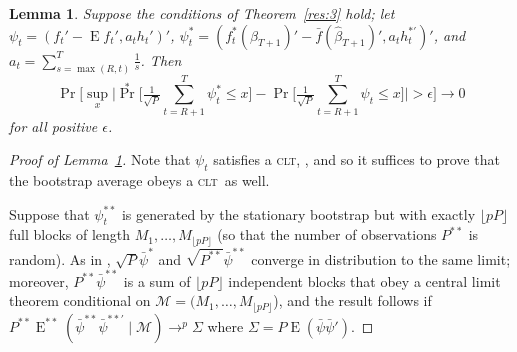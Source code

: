 \documentclass[11pt,fleqn]{article}
\newtheorem{lema}{Lemma}[section]
\theoremstyle{definition}
\DeclareMathOperator{\E}{E}
\DeclareMathOperator{\pr}{Pr}
\newcommand{\clt}{\textsc{clt}}
\begin{document}
\begin{lema}\label{res:a3}
  Suppose the conditions of Theorem~\ref{res:3} hold; let $\psi_{t} =
  (f_{t}' - \E f_{t}', a_t h_{t}')'$, $\psi_t^{*} =
  (f_t^{*}(\hat{\beta}_{T+1})' - \bar{f}(\hat{\beta}_{T+1})', a_t
  h_t^{*\prime})'$, and $a_t = \sum_{s=\max(R,t)}^T \tfrac{1}{s}$.  Then
  \begin{equation}\label{eq:1}
    \pr\Big[\sup_x \Big| \pr^{*}\Big[ \tfrac{1}{\sqrt{P}} \sum_{t=R+1}^T \psi_{t}^{*}
    \leq x \Big] - \pr\Big[ \tfrac{1}{\sqrt{P}} \sum_{t=R+1}^T \psi_{t}
    \leq x \Big] \Big| > \epsilon \Big] \to 0
  \end{equation}
  for all positive $\epsilon$.
\end{lema}

\begin{proof}[Proof of Lemma~\ref{res:a3}]
  Note that $\psi_t$ satisfies a \clt, \citep[Theorem~2]{Jon:97}, and
  so it suffices to prove that the bootstrap average obeys a \clt\ as
  well.

  Suppose that $\psi_t^{**}$ is generated by the stationary bootstrap but
  with exactly $\lfloor p P \rfloor$ full blocks of length
  $M_1,\dots,M_{\lfloor p P \rfloor}$ (so that the number of
  observations $P^{**}$ is random).  As in \citet{Cal:11d}, $\sqrt{P}
  \bar{\psi}^{*}$ and $\sqrt{P^{**}} \bar{\psi}^{**}$ converge in
  distribution to the same limit; moreover, $P^{**} \bar{\psi}^{**}$ is a
  sum of $\lfloor p P \rfloor$ independent blocks that obey a central
  limit theorem conditional on $\mathcal{M} = (M_1,\dots,M_{\lfloor p
    P \rfloor}$), and the result follows if $P^{**}
  \E^{**}(\bar{\psi}^{**} \bar{\psi}^{**\prime} \mid \mathcal{M}) \to^p
  \Sigma$ where $\Sigma = P \E(\bar{\psi} \bar{\psi}')$.


\end{proof}
\end{document}

